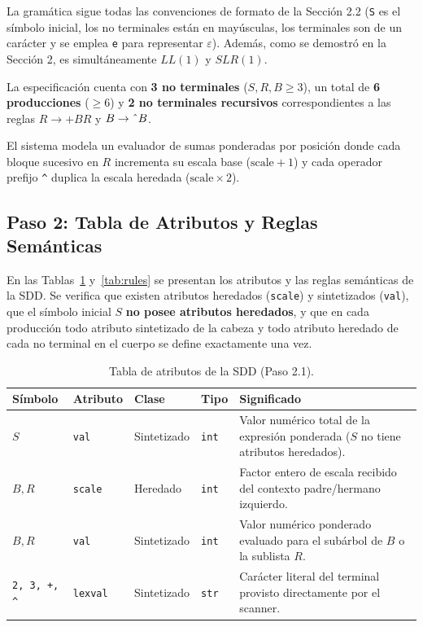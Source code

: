 \documentclass[11pt,a4paper]{article}
\begin{document}
La gram\'atica sigue todas las convenciones de formato de la Secci\'on 2.2 (\texttt{S} es el s\'imbolo inicial, los no terminales est\'an en may\'usculas, los terminales son de un car\'acter y se emplea \texttt{e} para representar $\varepsilon$). Adem\'as, como se demostr\'o en la Secci\'on 2, es simult\'aneamente $LL(1)$ y $SLR(1)$.

La especificaci\'on cuenta con \textbf{3 no terminales} ($S, R, B \ge 3$), un total de \textbf{6 producciones} ($\ge 6$) y \textbf{2 no terminales recursivos} correspondientes a las reglas $R \to +BR$ y $B \to \text{\^{}}B$.

El sistema modela un evaluador de sumas ponderadas por posici\'on donde cada bloque sucesivo en $R$ incrementa su escala base ($\text{scale} + 1$) y cada operador prefijo \texttt{\^{}} duplica la escala heredada ($\text{scale} \times 2$).

\subsection{Paso 2: Tabla de Atributos y Reglas Sem\'anticas}
En las Tablas~\ref{tab:attrs} y~\ref{tab:rules} se presentan los atributos y las reglas sem\'anticas de la SDD. Se verifica que existen atributos heredados (\texttt{scale}) y sintetizados (\texttt{val}), que el s\'imbolo inicial $S$ \textbf{no posee atributos heredados}, y que en cada producci\'on todo atributo sintetizado de la cabeza y todo atributo heredado de cada no terminal en el cuerpo se define exactamente una vez.

\begin{table}[htbp]
\centering
\small
\begin{tabular}{@{}llllp{7.2cm}@{}}
\toprule
\textbf{S\'imbolo} & \textbf{Atributo} & \textbf{Clase} & \textbf{Tipo} & \textbf{Significado} \\
\midrule
$S$ & \texttt{val} & Sintetizado & \texttt{int} & Valor num\'erico total de la expresi\'on ponderada ($S$ no tiene atributos heredados). \\
$B, R$ & \texttt{scale} & Heredado & \texttt{int} & Factor entero de escala recibido del contexto padre/hermano izquierdo. \\
$B, R$ & \texttt{val} & Sintetizado & \texttt{int} & Valor num\'erico ponderado evaluado para el sub\'arbol de $B$ o la sublista $R$. \\
\texttt{2, 3, +, \^{}} & \texttt{lexval} & Sintetizado & \texttt{str} & Car\'acter literal del terminal provisto directamente por el scanner. \\
\bottomrule
\end{tabular}
\caption{Tabla de atributos de la SDD (Paso 2.1).}
\label{tab:attrs}
\end{table}
\end{document}
